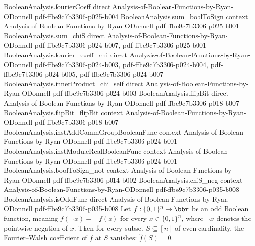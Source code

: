 \begin{lemma}
\proofstep
  {BooleanAnalysis.fourierCoeff}
  {direct}
  {Analysis-of-Boolean-Functions-by-Ryan-ODonnell}
  {pdf-ffbe9c7b3306-p025-b004}
\proofstep
  {BooleanAnalysis.sum_boolToSign}
  {context}
  {Analysis-of-Boolean-Functions-by-Ryan-ODonnell}
  {pdf-ffbe9c7b3306-p025-b001}
\proofstep
  {BooleanAnalysis.sum_chiS}
  {direct}
  {Analysis-of-Boolean-Functions-by-Ryan-ODonnell}
  {pdf-ffbe9c7b3306-p024-b007,
    pdf-ffbe9c7b3306-p025-b001}
\proofstep
  {BooleanAnalysis.fourier_coeff_chi}
  {direct}
  {Analysis-of-Boolean-Functions-by-Ryan-ODonnell}
  {pdf-ffbe9c7b3306-p024-b003,
    pdf-ffbe9c7b3306-p024-b004,
    pdf-ffbe9c7b3306-p024-b005,
    pdf-ffbe9c7b3306-p024-b007}
\proofstep
  {BooleanAnalysis.innerProduct_chi_self}
  {direct}
  {Analysis-of-Boolean-Functions-by-Ryan-ODonnell}
  {pdf-ffbe9c7b3306-p024-b003}
\proofstep
  {BooleanAnalysis.flipBit}
  {direct}
  {Analysis-of-Boolean-Functions-by-Ryan-ODonnell}
  {pdf-ffbe9c7b3306-p018-b007}
\proofstep
  {BooleanAnalysis.flipBit_flipBit}
  {context}
  {Analysis-of-Boolean-Functions-by-Ryan-ODonnell}
  {pdf-ffbe9c7b3306-p018-b007}
\proofstep
  {BooleanAnalysis.instAddCommGroupBooleanFunc}
  {context}
  {Analysis-of-Boolean-Functions-by-Ryan-ODonnell}
  {pdf-ffbe9c7b3306-p024-b001}
\proofstep
  {BooleanAnalysis.instModuleRealBooleanFunc}
  {context}
  {Analysis-of-Boolean-Functions-by-Ryan-ODonnell}
  {pdf-ffbe9c7b3306-p024-b001}
\proofstep
  {BooleanAnalysis.boolToSign_not}
  {context}
  {Analysis-of-Boolean-Functions-by-Ryan-ODonnell}
  {pdf-ffbe9c7b3306-p014-b002}
\proofstep
  {BooleanAnalysis.chiS_neg}
  {context}
  {Analysis-of-Boolean-Functions-by-Ryan-ODonnell}
  {pdf-ffbe9c7b3306-p035-b008}
\proofstep
  {BooleanAnalysis.isOddFunc}
  {direct}
  {Analysis-of-Boolean-Functions-by-Ryan-ODonnell}
  {pdf-ffbe9c7b3306-p035-b008}
Let $f : \{0,1\}^n \to \bbr$ be an odd Boolean function, meaning $f(\lnot x) = -f(x)$
for every $x \in \{0,1\}^n$, where $\lnot x$ denotes the pointwise negation of $x$. Then
for every subset $S \subseteq [n]$ of even cardinality, the Fourier--Walsh coefficient
of $f$ at $S$ vanishes: $\hat f(S) = 0$.
\end{lemma}

